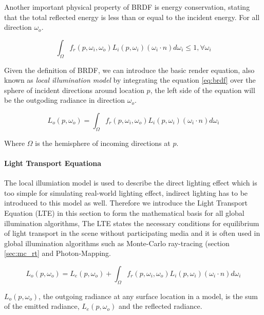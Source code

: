 Another important physical property of BRDF is energy conservation, stating that the total reflected energy is less than or equal to the incident energy. For all direction \( \omega_{o} \).

\begin{equation}
 \int_{\Omega}f_{r}(p, \omega_{i}, \omega_{o})L_{i}(p, \omega_{i})(\omega_{i} \cdot n)d\omega_{i} \leq 1 , \forall \omega_{i}
\end{equation}

Given the definition of BRDF, we can introduce the basic render equation, also known as \emph{local illumination model} by integrating the equation \ref{eq:brdf} over the sphere of incident directions around location \(p\), the left side of the equation will be the outgoding radiance in direction \(\omega_{o}\).

\begin{equation}
L_{o}(p, \omega_{o}) = \int_{\Omega}f_{r}(p, \omega_{i}, \omega_{o})L_{i}(p, \omega_{i})(\omega_{i} \cdot n)d\omega_{i}
\label{eq:local_render_equation}
\end{equation}

Where \(\Omega\) is the hemisphere of incoming directions at \(p\).

\paragraph{Light Transport Equationa} 

The local illumiation model is used to describe the direct lighting effect which is too simple for simulating real-world lighting effect, indirect lighting has to be introduced to this model as well. Therefore we introduce the Light Transport Equation (LTE) in this section to form the mathematical basis for all global illumination algorithms, The LTE states the necessary conditions for equilibrium of light transport in the scene without participating media and it is often used in global illumination algorithms such as Monte-Carlo ray-tracing (section \ref{sec:mc_rt} and Photon-Mapping. 

\begin{equation}
L_{o}(p, \omega_{o}) = L_{e}(p, \omega_{o}) + \int_{\Omega}f_{r}(p, \omega_{i}, \omega_{o})L_{i}(p, \omega_{i})(\omega_{i} \cdot n)d\omega_{i}
\label{eq:lte}
\end{equation}

\( L_{o}(p, \omega_{o}) \), the outgoing radiance at any surface location in a model, is the sum of the emitted radiance, \( L_{e}(p, \omega_{o}) \) and the reflected radiance. 


